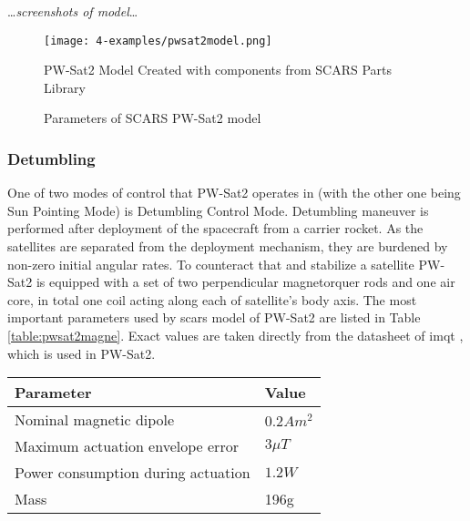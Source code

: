         \dots\textit{screenshots of model}\dots
                         
        \begin{figure}[H]
            \centering
            \texttt{[image: 4-examples/pwsat2model.png]}
            \caption{PW-Sat2 Model Created with components from SCARS Parts Library}
            \label{fig:pwsat2model}
        \end{figure}

        
        \begin{figure}[H]
            \centering
            \qquad
            \caption{Parameters of SCARS PW-Sat2 model}%
            \label{fig:step6}%
        \end{figure}

        \subsubsection{Detumbling}
            One of two modes of control that PW-Sat2 operates in (with the other one being Sun Pointing Mode) is Detumbling Control Mode. Detumbling maneuver is performed after deployment of the spacecraft from a carrier rocket. As the satellites are separated from the deployment mechanism, they are burdened by non-zero initial angular rates. To counteract that and stabilize a satellite PW-Sat2 is equipped with a set of two perpendicular magnetorquer rods and one air core, in total one coil acting along each of satellite's body axis. The most important parameters used by \ac{scars} model of PW-Sat2 are listed in Table \ref{table:pwsat2magne}.\cite{pwsat2adcs} Exact values are taken directly from the datasheet of \ac{imqt} \cite{imqt-datasheet}, which is used in PW-Sat2.

                \begin{center}    
                    \small
                    \begin{tabular}{l l}
                        \textbf{Parameter} & \textbf{Value} \\ \hline
                        Nominal magnetic dipole & $0.2 Am^2$ \\
                        Maximum actuation envelope error & $3\mu T$ \\
                        Power consumption during actuation & $1.2W$ \\
                        Mass & 196g
                    \end{tabular}
                \end{center}\label{table:pwsat2magne}

